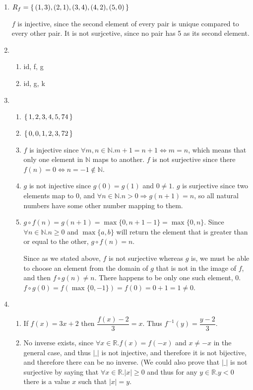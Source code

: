 \documentclass{article}
\begin{document}
\begin{enumerate}
    \item 
        $R_f = \set{(1,3), (2,1), (3,4), (4,2), (5,0)}$

        $f$ is injective, since the second element of every pair is unique compared to every other pair. It is not surjcetive, since no pair has 5 as its second element.

    \item
        \begin{enumerate}
            \item id, f, g
            \item id, g, k
        \end{enumerate}

    \item
        \begin{enumerate}
            \item $\set{1,2,3,4,5,74}$
            \item $\set{0, 0, 1, 2, 3, 72}$
            \item $f$ is injective since $\forall m,n \in \mathbb{N}. m + 1 = n + 1 \Leftrightarrow m = n$, which means that only one element in $\mathbb{N}$ maps to another. $f$ is not surjective since there $f(n) = 0 \Leftrightarrow n = -1 \not\in \mathbb{N}$.
            \item $g$ is not injective since $g(0) = g(1)$ and $0 \neq 1$. $g$ is surjective since two elements map to $0$, and $\forall n \in \mathbb{N} . n > 0 \Rightarrow g(n + 1) = n$, so all natural numbers have some other number mapping to them. 
            \item
                $g \circ f(n) = g(n+1) = \max\{0,n+1-1\} = \max\{0,n\}$. Since $\forall n \in \mathbb{N} . n \geq 0 $ and $\max\{a,b\}$ will return the element that is greater than or equal to the other, $g \circ f(n) = n$.

                Since as we stated above, $f$ is not surjective whereas $g$ is, we must be able to choose an element from the domain of $g$ that is not in the image of $f$, and then $f \circ g (n) \neq n$. There happens to be only one such element, 0. $f \circ g (0) = f(\max\{0,-1\}) = f(0) = 0 +1 = 1 \neq 0$.
        \end{enumerate}

    \item
        \begin{enumerate}
            \item 
                If $f(x) = 3x + 2$ then $\dfrac{f(x) - 2}{3} = x$. Thus $f^{-1}(y) = \dfrac{y - 2}{3}$. 
            \item No inverse exists, since $\forall x \in \mathbb{R}.f(x) = f(-x)$ and $x \neq -x$ in the general case, and thus $|\_|$ is not injective, and therefore it is not bijective, and therefore there can be no inverse. (We could also prove that $|\_|$ is not surjective by saying that $\forall x \in \mathbb{R} . |x| \geq 0$ and thus for any $y \in \mathbb{R}. y < 0$ there is a value $x$ such that $|x| = y$.

        \end{enumerate}


\end{enumerate}
\end{document}
